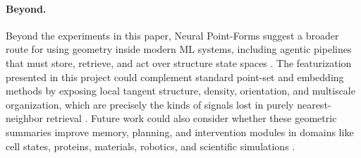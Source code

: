 \documentclass{article}
\let\todo\undefined
\let\todo\undefined
\newcommand{\todo}[1][]{}
\theoremstyle{remark}
\theoremstyle{plain}
\begin{document}
\paragraph{Beyond.} Beyond the experiments in this paper, Neural Point-Forms suggest a broader route for using geometry inside modern ML systems, including agentic pipelines that must store, retrieve, and act over structure state spaces \citep{ha2018worldmodels,yao2023react,park2023generative}. The featurization presented in this project could complement standard point-set and embedding methods by exposing local tangent structure, density, orientation, and multiscale organization, which are precisely the kinds of signals lost in purely nearest-neighbor retrieval \citep{qi2017pointnet,bronstein2021geometric,coifman2006diffusion}. Future work could also consider whether these geometric summaries improve memory, planning, and intervention modules in domains like cell states, proteins, materials, robotics, and scientific simulations \citep{hirani2003discrete,desbrun2003discrete,lewis2020retrieval}.

















{
\small




}
\end{document}
